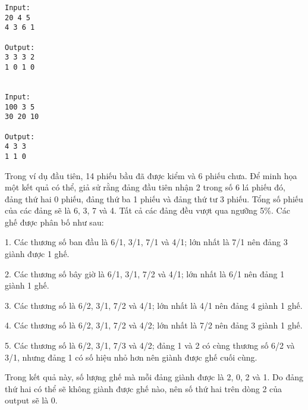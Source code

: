 \begin{verbatim}
Input:
20 4 5
4 3 6 1

Output:
3 3 3 2
1 0 1 0


Input:
100 3 5
30 20 10

Output:
4 3 3
1 1 0

\end{verbatim}

   Trong ví dụ đầu tiên, 14 phiếu bầu đã được kiểm và 6 phiếu chưa. Để minh họa một kết quả có thể, giả sử rằng đảng đầu tiên nhận 2 trong số 6 lá phiếu đó, đảng thứ hai 0 phiếu, đảng thứ ba 1 phiếu và đảng thứ tư 3 phiếu. Tổng số phiếu của các đảng sẽ là 6, 3, 7 và 4. Tất cả các đảng đều vượt qua ngưỡng 5\%. Các ghế được phân bố như sau:  
\begin{itemize}

    1. Các thương số ban đầu là 6/1, 3/1, 7/1 và 4/1; lớn nhất là 7/1 nên đảng 3 giành được 1 ghế.   

    2. Các thương số bây giờ là 6/1, 3/1, 7/2 và 4/1; lớn nhất là 6/1 nên đảng 1 giành 1 ghế.   

    3. Các thương số là 6/2, 3/1, 7/2 và 4/1; lớn nhất là 4/1 nên đảng 4 giành 1 ghế.   

    4. Các thương số là 6/2, 3/1, 7/2 và 4/2; lớn nhất là 7/2 nên đảng 3 giành 1 ghế.   

    5. Các thương số là 6/2, 3/1, 7/3 và 4/2; đảng 1 và 2 có cùng thương số 6/2 và 3/1, nhưng đảng 1 có số hiệu nhỏ hơn nên giành được ghế cuối cùng.   
\end{itemize}

   Trong kết quả này, số lượng ghế mà mỗi đảng giành được là 2, 0, 2 và 1. Do đảng thứ hai có thể sẽ không giành được ghế nào, nên số thứ hai trên dòng 2 của output sẽ là 0.